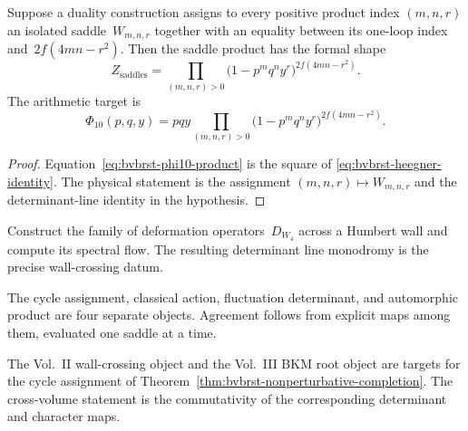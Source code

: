 \begin{conjecture}
\label{thm:bvbrst-nonperturbative-completion}
Suppose a duality construction assigns to every positive product
index $(m,n,r)$ an isolated saddle~$W_{m,n,r}$ together with an
equality between its one-loop index and~$2f(4mn-r^2)$.  Then the
saddle product has the formal shape
\begin{equation}\label{eq:bvbrst-nonpert-completion}
 Z_{\mathrm{saddles}}=
 \prod_{(m,n,r)>0}
 \bigl(1-p^mq^ny^r\bigr)^{2f(4mn-r^2)}.
\end{equation}
The arithmetic target is
\begin{equation}\label{eq:bvbrst-phi10-product}
 \Phi_{10}(p,q,y)=pqy
 \prod_{(m,n,r)>0}
 \bigl(1-p^mq^ny^r\bigr)^{2f(4mn-r^2)}.
\end{equation}
\end{conjecture}

\begin{proof}
Equation~\eqref{eq:bvbrst-phi10-product} is the square of
\eqref{eq:bvbrst-heegner-identity}.  The physical statement is the
assignment $(m,n,r)\mapsto W_{m,n,r}$ and the determinant-line
identity in the hypothesis.
\end{proof}

\begin{problem}
\label{rem:bvbrst-schwinger-humbert}
Construct the family of deformation operators~$D_{W_4}$ across a
Humbert wall and compute its spectral flow.  The resulting determinant
line monodromy is the precise wall-crossing datum.
\end{problem}

\begin{remark}
\label{rem:bvbrst-d3-multipath}
The cycle assignment, classical action, fluctuation determinant,
and automorphic product are four separate objects.  Agreement follows
from explicit maps among them, evaluated one saddle at a time.
\end{remark}

\begin{remark}
\label{rem:bvbrst-nonpert-cross-volume}
The Vol.~II wall-crossing object and the Vol.~III BKM root object are
targets for the cycle assignment of
Theorem~\ref{thm:bvbrst-nonperturbative-completion}.  The cross-volume
statement is the commutativity of the corresponding determinant and
character maps.
\end{remark}

